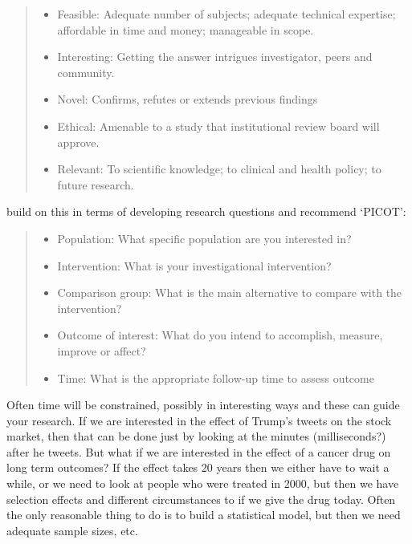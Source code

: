 \documentclass[
]{book}
\providecommand{\tightlist}{%
  \setlength{\itemsep}{0pt}\setlength{\parskip}{0pt}}
\begin{document}
\begin{quote}
\begin{itemize}
\tightlist
\item
  Feasible: Adequate number of subjects; adequate technical expertise; affordable in time and money; manageable in scope.
\item
  Interesting: Getting the answer intrigues investigator, peers and community.
\item
  Novel: Confirms, refutes or extends previous findings
\item
  Ethical: Amenable to a study that institutional review board will approve.
\item
  Relevant: To scientific knowledge; to clinical and health policy; to future research.
\end{itemize}
\end{quote}

\citet{farrugia2010research} build on this in terms of developing research questions and recommend `PICOT':

\begin{quote}
\begin{itemize}
\tightlist
\item
  Population: What specific population are you interested in?
\item
  Intervention: What is your investigational intervention?
\item
  Comparison group: What is the main alternative to compare with the intervention?
\item
  Outcome of interest: What do you intend to accomplish, measure, improve or affect?
\item
  Time: What is the appropriate follow-up time to assess outcome
\end{itemize}
\end{quote}

Often time will be constrained, possibly in interesting ways and these can guide your research. If we are interested in the effect of Trump's tweets on the stock market, then that can be done just by looking at the minutes (milliseconds?) after he tweets. But what if we are interested in the effect of a cancer drug on long term outcomes? If the effect takes 20 years then we either have to wait a while, or we need to look at people who were treated in 2000, but then we have selection effects and different circumstances to if we give the drug today. Often the only reasonable thing to do is to build a statistical model, but then we need adequate sample sizes, etc.
\end{document}
